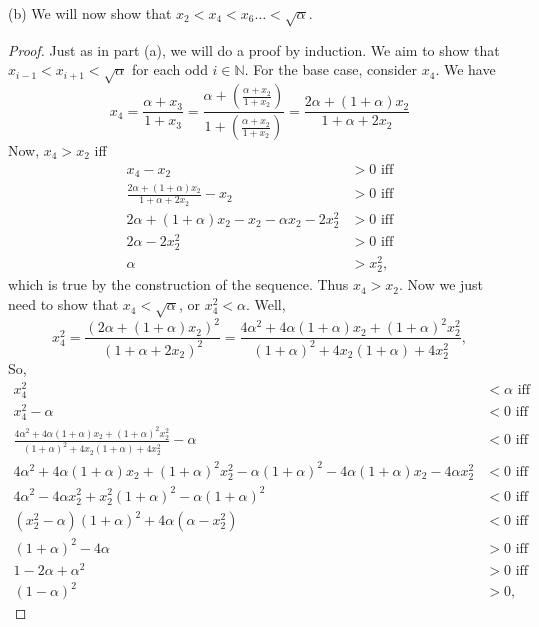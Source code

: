 \documentclass[11pt]{amsart}
\begin{document}
(b) We will now show that $x_{2} < x_{4} < x_{6} \hdots < \sqrt{\alpha}$.
\begin{proof}
  Just as in part (a), we will do a proof by induction. We aim to show that $x_{i-1} < x_{i+1} < \sqrt{\alpha}$ for each odd $i\in \mathbb{N}$. For the base case, consider $x_{4}$. We have
  \[ x_{4} = \frac{\alpha + x_{3}}{1 + x_{3}} = \frac{\alpha + \left(\frac{\alpha + x_{2}}{1 + x_{2}}\right)}{1 + \left(\frac{\alpha + x_{2}}{1 + x_{2}}\right)} = \frac{2\alpha + (1+\alpha)x_{2}}{1 + \alpha + 2x_{2}} \]
  Now, $x_{4} > x_{2}$ iff 
  \begin{align*}
    x_{4} - x_{2} & > 0 \text{ iff} \\
    \frac{2\alpha + (1+\alpha)x_{2}}{1 + \alpha + 2x_{2}} - x_{2} & > 0 \text{ iff} \\
    2\alpha + (1+\alpha)x_{2} - x_{2} - \alpha x_{2} - 2x_{2}^{2} & > 0 \text{ iff} \\
    2\alpha - 2x_{2}^{2} & > 0 \text{ iff} \\
    \alpha & > x_{2}^{2},
  \end{align*}
  which is true by the construction of the sequence. Thus $x_{4} > x_{2}$. Now we just need to show that $x_{4} < \sqrt{\alpha}$, or $x_{4}^{2} < \alpha$. Well,
  \[ x_{4}^{2} = \frac{(2\alpha + (1+\alpha)x_{2})^{2}}{(1 + \alpha + 2x_{2})^{2}} = \frac{4\alpha^{2} + 4\alpha(1+\alpha)x_{2} + (1+\alpha)^{2}x_{2}^{2}}{(1+\alpha)^{2} + 4x_{2}(1+\alpha) + 4x_{2}^{2}}, \]
  So,
  \begin{align*}
    x_{4}^{2} & < \alpha \text{ iff} \\
    x_{4}^{2} - \alpha & < 0 \text{ iff} \\
    \frac{4\alpha^{2} + 4\alpha(1+\alpha)x_{2} + (1+\alpha)^{2}x_{2}^{2}}{(1+\alpha)^{2} + 4x_{2}(1+\alpha) + 4x_{2}^{2}} - \alpha & < 0 \text{ iff} \\
    4\alpha^{2} + 4\alpha(1+\alpha)x_{2} + (1+\alpha)^{2}x_{2}^{2} - \alpha(1+\alpha)^{2} - 4\alpha(1+\alpha)x_{2} - 4\alpha x_{2}^{2} & < 0\text{ iff} \\
    4\alpha^{2} - 4\alpha x_{2}^{2} + x_{2}^{2}(1+\alpha)^{2} - \alpha(1+\alpha)^{2} & < 0 \text{ iff} \\
    (x_{2}^{2} - \alpha)(1+\alpha)^{2} + 4\alpha(\alpha - x_{2}^{2}) & < 0 \text{ iff} \\
    (1 + \alpha)^{2} - 4\alpha & > 0 \text{ iff} \\
    1 - 2\alpha + \alpha^{2} & > 0 \text{ iff} \\
    (1 - \alpha)^{2} & > 0,
  \end{align*}

\end{proof}
\end{document}
